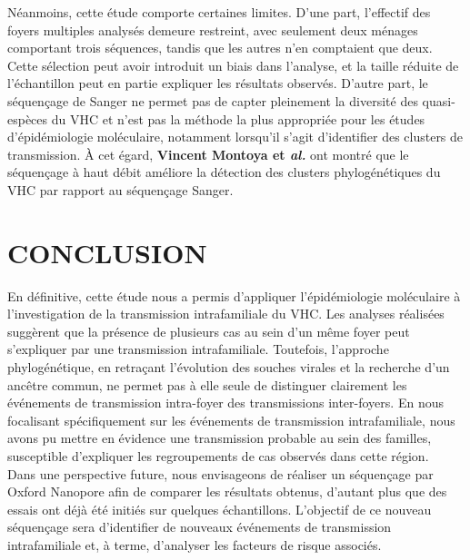 \documentclass[a4paper,12pt]{article}
\begin{document}
Néanmoins, cette étude comporte certaines limites. D’une part, l’effectif des foyers multiples analysés demeure restreint, avec seulement deux ménages comportant trois séquences, tandis que les autres n’en comptaient que deux. Cette sélection peut avoir introduit un biais dans l’analyse, et la taille réduite de l’échantillon peut en partie expliquer les résultats observés. D’autre part, le séquençage de Sanger ne permet pas de capter pleinement la diversité des quasi-espèces du VHC et n’est pas la méthode la plus appropriée pour les études d’épidémiologie moléculaire, notamment lorsqu’il s’agit d’identifier des clusters de transmission. À cet égard, \textbf{Vincent Montoya et \textit{al.}} \cite{montoyaDeepSequencingIncreases2016} ont montré que le séquençage à haut débit améliore la détection des clusters phylogénétiques du VHC par rapport au séquençage Sanger. \\

\newpage 
\section*{CONCLUSION}

En définitive, cette étude nous a permis d’appliquer l’épidémiologie moléculaire à l’investigation de la transmission intrafamiliale du VHC. Les analyses réalisées suggèrent que la présence de plusieurs cas au sein d’un même foyer peut s’expliquer par une transmission intrafamiliale. Toutefois, l’approche phylogénétique, en retraçant l’évolution des souches virales et la recherche d’un ancêtre commun, ne permet pas à elle seule de distinguer clairement les événements de transmission intra-foyer des transmissions inter-foyers. En nous focalisant spécifiquement sur les événements de transmission intrafamiliale, nous avons pu mettre en évidence une transmission probable au sein des familles, susceptible d’expliquer les regroupements de cas observés dans cette région.\\

Dans une perspective future, nous envisageons de réaliser un séquençage par Oxford Nanopore afin de comparer les résultats obtenus, d’autant plus que des essais ont déjà été initiés sur quelques échantillons. L’objectif de ce nouveau séquençage sera d’identifier de nouveaux événements de transmission intrafamiliale et, à terme, d’analyser les facteurs de risque associés.\\ 

\end{document}
